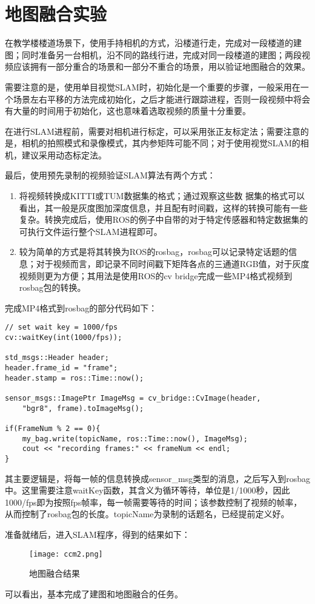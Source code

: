 \section{地图融合实验}

在教学楼楼道场景下，使用手持相机的方式，沿楼道行走，完成对一段楼道的建图；同时准备另一台相机，沿不同的路线行进，完成对同一段楼道的建图；两段视频应该拥有一部分重合的场景和一部分不重合的场景，用以验证地图融合的效果。

需要注意的是，使用单目视觉SLAM时，初始化是一个重要的步骤，一般采用在一个场景左右平移的方法完成初始化，之后才能进行跟踪进程，否则一段视频中将会有大量的时间用于初始化，这也意味着选取视频的质量十分重要。

在进行SLAM进程前，需要对相机进行标定，可以采用张正友标定法；需要注意的是，相机的拍照模式和录像模式，其内参矩阵可能不同；对于使用视觉SLAM的相机，建议采用动态标定法。

最后，使用预先录制的视频验证SLAM算法有两个方式：

\begin{enumerate}
	\item 将视频转换成KITTI或TUM数据集的格式；通过观察这些数
	据集的格式可以看出，其一般是灰度图加深度信息，并且配有时间戳，这样的转换可能有一些复杂。转换完成后，使用ROS的例子中自带的对于特定传感器和特定数据集的可执行文件运行整个SLAM进程即可。
	\item 较为简单的方式是将其转换为ROS的rosbag，rosbag可以记录特定话题的信息；对于视频而言，即记录不同时间戳下矩阵各点的三通道RGB值，对于灰度视频则更为方便；其用法是使用ROS的cv bridge完成一些MP4格式视频到rosbag包的转换。
\end{enumerate}

完成MP4格式到rosbag的部分代码如下：

\begin{verbatim}
// set wait key = 1000/fps
cv::waitKey(int(1000/fps));

std_msgs::Header header;
header.frame_id = "frame";
header.stamp = ros::Time::now();

sensor_msgs::ImagePtr ImageMsg = cv_bridge::CvImage(header, 
    "bgr8", frame).toImageMsg();

if(FrameNum % 2 == 0){
    my_bag.write(topicName, ros::Time::now(), ImageMsg);
    cout << "recording frames:" << frameNum << endl;
}
\end{verbatim}

其主要逻辑是，将每一帧的信息转换成sensor\_msg类型的消息，之后写入到rosbag中。这里需要注意waitKey函数，其含义为循环等待，单位是1/1000秒，因此1000/fps即为按照fps帧率，每一帧需要等待的时间；该参数控制了视频的帧率，从而控制了rosbag包的长度。topicName为录制的话题名，已经提前定义好。

准备就绪后，进入SLAM程序，得到的结果如下：

\begin{figure}[!ht]
	\centering
	\texttt{[image: ccm2.png]}
	\caption{地图融合结果}
	\label{fig5-1}
\end{figure}

可以看出，基本完成了建图和地图融合的任务。